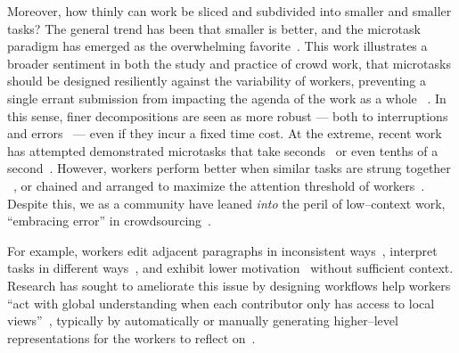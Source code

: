 \documentclass[trackingWork]{subfiles}
\begin{document}
Moreover, how thinly can work be sliced and subdivided into smaller and smaller tasks? 
The general trend has been that smaller is better, and the microtask paradigm has emerged as the overwhelming favorite~\cite{selfsourcingTeevan2014,selfsourcingTeevan2016}.
This work illustrates a broader sentiment in both the study and practice
of crowd work, that microtasks should be designed resiliently against the variability of workers, preventing a single errant submission from impacting the agenda of the work as a whole %
~\cite{interruptionIqbal,delayAndOrderLasecki,vaish2014low}.
In this sense, finer decompositions are seen as more robust --- both to interruptions and errors~\cite{cheng2015break} --- even if they incur a fixed time cost.
At the extreme, recent work has attempted demonstrated microtasks that take seconds~\cite{Vaish:2014:TCC:2611222.2556996,Cai:2015:WLW:2702123.2702267} or even tenths of a second~\cite{embracingErrorKrishna}.
However, workers perform better when similar tasks are strung together ~\cite{delayAndOrderLasecki}, or chained and arranged to maximize  the attention threshold of workers~\cite{Cai:2016:CRI:2858036.2858237}.
Despite this, 
we as a community have leaned \textit{into} the peril of
low--context work, ``embracing error'' in crowdsourcing~\cite{embracingErrorKrishna}.


For example, workers edit adjacent paragraphs in inconsistent ways~\cite{bernsteinSoylent,Kim2017}, interpret tasks in different ways~\cite{kairam2016parting}, and exhibit lower motivation~\cite{Kinnaird:2012:WTM:2389176.2389219} without sufficient context.
Research has sought to ameliorate this issue by designing workflows help workers ``act with global understanding when each contributor only has access to local views''~\cite{verroios2014context}, typically by automatically or manually generating higher--level representations for the workers to reflect on~\cite{chilton2013cascade,verroios2014context,Kim2017}.
\end{document}
